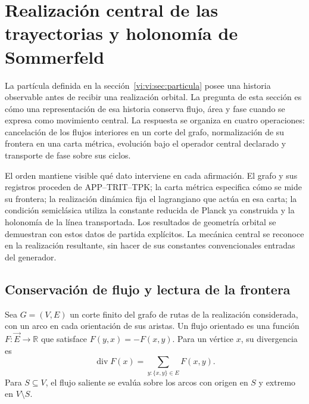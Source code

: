 \section{Realización central de las trayectorias y holonomía de Sommerfeld}
\label{vi:vi:sec:kepler}

La partícula definida en la sección~\ref{vi:vi:sec:particula} posee
una historia observable antes de recibir una realización orbital.
La pregunta de esta sección es cómo una representación de esa
historia conserva flujo, área y fase cuando se expresa como
movimiento central. La respuesta se organiza en cuatro operaciones:
cancelación de los flujos interiores en un corte del grafo,
normalización de su frontera en una carta métrica, evolución bajo
el operador central declarado y transporte de fase sobre sus ciclos.

El orden mantiene visible qué dato interviene en cada afirmación.
El grafo y sus registros proceden de APP--TRIT--TPK; la carta
métrica especifica cómo se mide su frontera; la realización dinámica
fija el lagrangiano que actúa en esa carta; la condición semiclásica
utiliza la constante reducida de Planck ya construida y la holonomía
de la línea transportada. Los resultados de geometría orbital se
demuestran con estos datos de partida explícitos. La mecánica
central se reconoce en la realización resultante, sin hacer de sus
constantes convencionales entradas del generador.

\subsection{Conservación de flujo y lectura de la frontera}
\label{vi:vi:subsec:gauss}

Sea $G=(V,E)$ un corte finito del grafo de rutas de la
realización considerada, con un arco en cada orientación de sus
aristas. Un flujo orientado es una función
$F:\vec E\to\mathbb R$ que satisface
$F(y,x)=-F(x,y)$. Para un vértice $x$, su divergencia es
\begin{equation}
 \operatorname{div}F(x)
 =\sum_{y:\{x,y\}\in E}F(x,y).
 \label{vi:vi:eq:divergencia-grafo}
\end{equation}
Para $S\subseteq V$, el flujo saliente se evalúa sobre los
arcos con origen en $S$ y extremo en $V\setminus S$.


